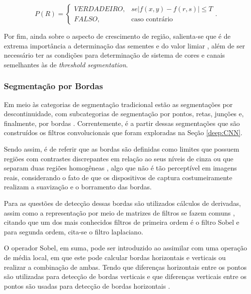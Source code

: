 \begin{equation}
\label{segment:eq:3}
P(R) = \left\{\begin{matrix}
    VERDADEIRO, & se |f(x,y) - f(r,s)| \leq T \\
    FALSO,      &  \text{caso contrário}
\end{matrix}\right..
\end{equation}

Por fim, ainda sobre o aspecto de crescimento de região, salienta-se que é de extrema importância a determinação das sementes e do valor limiar \cite{Yuheng2017, pedrini2008analise}, além de ser necessário ter as condições para determinação de sistema de cores e canais semelhantes às de \textit{threshold segmentation}.


\subsubsection{Segmentação por Bordas}
\label{segment:limit}

Em meio às categorias de segmentação tradicional estão as segmentações por descontinuidade, com subcategorias de segmentação por pontos, retas, junções e, finalmente, por bordas \cite{pedrini2008analise}. Correntemente, é a partir dessas segmentações que são construídos os filtros convolucionais que foram exploradas na Seção \ref{deep:CNN}.

Sendo assim, é de referir que as bordas são definidas como limites que possuem regiões com contrastes discrepantes em relação ao seus níveis de cinza  ou que separam duas regiões homogêneas \cite{pedrini2008analise,Yuheng2017}, algo que não é tão perceptível em imagens reais, considerando o fato de que os dispositivos de captura costumeiramente realizam a suavização e o borramento das bordas.

Para as questões de detecção dessas bordas são utilizados cálculos de derivadas, assim  como a representação por meio de matrizes de filtros se fazem comuns \cite{pedrini2008analise, muthukrishnan2011edge}, citando que um dos mais conhecidos filtros de primeira ordem é o filtro Sobel e para segunda ordem, cita-se o filtro laplaciano.

O operador Sobel, em suma, pode ser introduzido ao assimilar com uma operação de média local, em que este pode calcular bordas horizontais e verticais ou realizar a combinação de ambas. Tendo que diferenças horizontais entre os pontos são utilizadas para detecção de bordas verticais e que diferenças verticais entre os pontos são usadas para detecção de bordas horizontais \cite{pedrini2008analise}.

